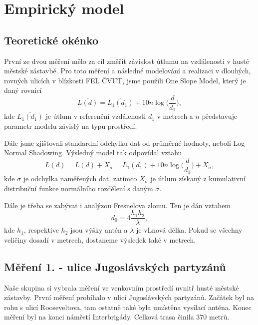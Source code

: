 \chapter{Empirický model}
\section{Teoretické okénko}

První ze dvou měření mělo za cíl změřit závislost útlumu na vzdálenosti v husté městské zástavbě. Pro toto měření a následné modelování a realizaci v dlouhých, rovných ulicích v blízkosti FEL ČVUT, jsme použili One Slope Model, který je daný rovnicí 
\begin{equation}
    \overline{L(d)} = \overline{L_1(d_1)} + 10 n \log \big ( \frac{d}{d_1}\big),
\end{equation}
kde $\overline{L_1(d_1)}$ je útlum v referenční vzdálenosti $d_1$ v metrech a $n$ představuje parametr modelu závislý na typu prostředí.

Dále jsme zjišťovali standardní odchylku dat od průměrné hodnoty, neboli Log-Normal Shadowing. Výsledný model tak odpovídal vztahu 
\begin{equation}
    L(d) = \overline{L(d)} + X_\sigma = \overline{L_1(d_1)} + 10 n \log \big ( \frac{d}{d_1}\big) + X_\sigma,
\end{equation}
kde $\sigma$ je odchylka naměřených dat, zatímco $X_\sigma$ je útlum získaný z kumulativní distribuční funkce normálního rozdělení s daným $\sigma$.

Dále je třeba se zabývat i analýzou Fresnelova zlomu. Ten je dán vztahem
\begin{equation}
    d_0 = 4\frac{h_1 h_2}{\lambda},
\end{equation}
kde $h_1$, respektive $h_2$ jsou výšky antén a $\lambda$ je vLnová délka. Pokud se všechny veličiny dosadí v metrech, dostaneme výsledek také v metrech.

\section{Měření 1. - ulice Jugoslávských partyzánů}
Naše skupina si vybrala měření ve venkovním prostředí uvnitř husté městské zástavby. První měření probíhalo v ulici Jugoslávských partyzánů. Začátek byl na rohu s ulicí Rooseveltova, tam ostatně také byla umístěna vysílací anténa. Konec měření byl na konci náměstí Interbrigády. Celková trasa činila 370 metrů. 

